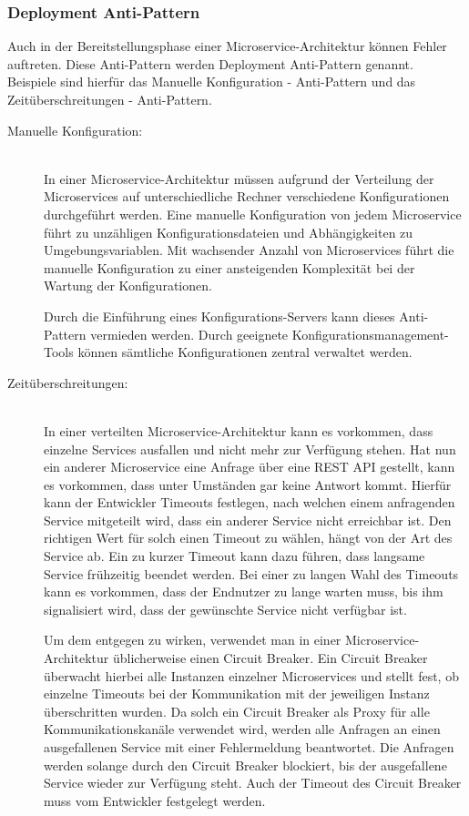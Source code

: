 \subsubsection*{Deployment Anti-Pattern}

Auch in der Bereitstellungsphase einer Microservice-Architektur können Fehler auftreten. Diese Anti-Pattern werden Deployment Anti-Pattern genannt. Beispiele sind hierfür das \glqq Manuelle Konfiguration\grqq{} - Anti-Pattern und das \glqq Zeitüberschreitungen\grqq{} - Anti-Pattern.

\begin{description}
    \item[Manuelle Konfiguration:]\hfill \\
    In einer Microservice-Architektur müssen aufgrund der Verteilung der Microservices auf unterschiedliche Rechner verschiedene Konfigurationen durchgeführt werden. Eine manuelle Konfiguration von jedem Microservice führt zu unzähligen Konfigurationsdateien und Abhängigkeiten zu Umgebungsvariablen. Mit wachsender Anzahl von Microservices führt die manuelle Konfiguration zu einer ansteigenden Komplexität bei der Wartung der Konfigurationen.

    Durch die Einführung eines Konfigurations-Servers kann dieses Anti-Pattern vermieden werden. Durch geeignete Konfigurationsmanagement-Tools können sämtliche Konfigurationen zentral verwaltet werden.
    
    \item[Zeitüberschreitungen:]\hfill \\
    In einer verteilten Microservice-Architektur kann es vorkommen, dass einzelne Services ausfallen und nicht mehr zur Verfügung stehen. Hat nun ein anderer Microservice eine Anfrage über eine REST API gestellt, kann es vorkommen, dass unter Umständen gar keine Antwort kommt. Hierfür kann der Entwickler Timeouts festlegen, nach welchen einem anfragenden Service mitgeteilt wird, dass ein anderer Service nicht erreichbar ist. Den richtigen Wert für solch einen Timeout zu wählen, hängt von der Art des Service ab. Ein zu kurzer Timeout kann dazu führen, dass langsame Service frühzeitig beendet werden. Bei einer zu langen Wahl des Timeouts kann es vorkommen, dass der Endnutzer zu lange warten muss, bis ihm signalisiert wird, dass der gewünschte Service nicht verfügbar ist.

    Um dem entgegen zu wirken, verwendet man in einer Microservice-Architektur üblicherweise einen Circuit Breaker. Ein Circuit Breaker überwacht hierbei alle Instanzen einzelner Microservices und stellt fest, ob einzelne Timeouts bei der Kommunikation mit der jeweiligen Instanz überschritten wurden. Da solch ein Circuit Breaker als Proxy für alle Kommunikationskanäle verwendet wird, werden alle Anfragen an einen ausgefallenen Service mit einer Fehlermeldung beantwortet. Die Anfragen werden solange durch den Circuit Breaker blockiert, bis der ausgefallene Service wieder zur Verfügung steht. Auch der Timeout des Circuit Breaker muss vom Entwickler festgelegt werden.

\end{description}

